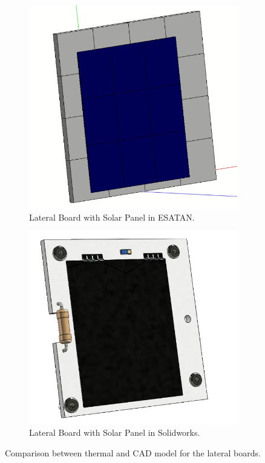 \begin{figure}[H]
  \centering
  \begin{subfigure}{.5\textwidth}
    \centering
    \includegraphics[width=.6\linewidth]{res/img/5_simulationanalisys/Comparisons/ESATAN/lateral.PNG}
    \caption{Lateral Board with Solar Panel in ESATAN.}
    \label{fig:lateralboard}
  \end{subfigure}%
  \begin{subfigure}{.5\textwidth}
    \centering
    \includegraphics[width=.5\linewidth]{res/img/5_simulationanalisys/Comparisons/SLDW/lateral_Solid.PNG}
    \caption{Lateral Board with Solar Panel in Solidworks.}
    \label{fig:lateralboardsolid}
  \end{subfigure}
  \caption{Comparison between thermal and CAD model for the lateral boards.}
  \label{fig:lateralboardim}
\end{figure}

